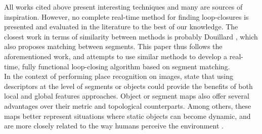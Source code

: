 All works cited above present interesting techniques and many are sources of inspiration. However, no complete real-time method for finding loop-closures is presented and evaluated in the literature to the best of our knowledge. The closest work in terms of similarity between methods is probably Douillard \cite{douillard2012scan}, which also proposes matching between segments. This paper thus follows the aforementioned work, and attempts to use similar methods to develop a real-time, fully functional loop-closing algorithm based on segment matching.\\

In the context of performing place recognition on images, \citet{lowryvisual} state that using descriptors at the level of segments or objects could provide the benefits of both local and global features approaches. Object or segment maps also offer several advantages over their metric and topological counterparts. Among others, these maps better represent situations where static objects can become dynamic, and are more closely related to the way humans perceive the environment \cite{thrun2002robotic}.\\


% 
% 
% 
% 

